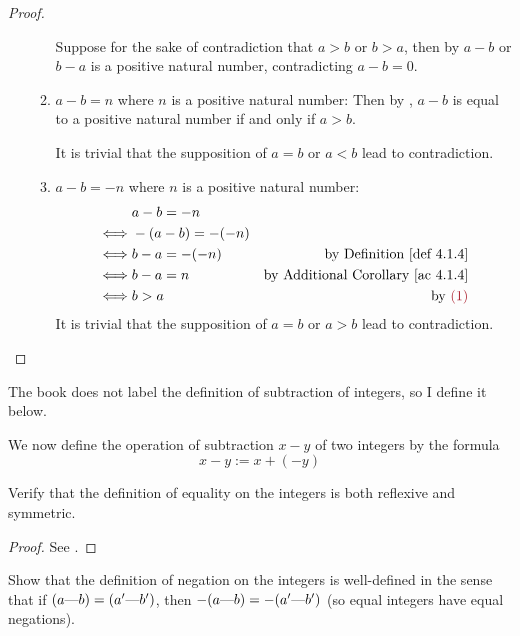 \begin{proof}
\begin{enumerate}
\begin{enumerate}
            Suppose for the sake of contradiction that \(a > b\) or \(b > a\), then by  \(a - b\) or \(b - a\) is a positive natural number, contradicting \(a - b = 0\).
        \item \(a - b = n\) where \(n\) is a positive natural number:
            Then by , \(a - b\) is equal to a positive natural number if and only if \(a > b\).
            
            It is trivial that the supposition of \(a = b\) or \(a < b\) lead to contradiction.
        \item \(a - b = -n\) where \(n\) is a positive natural number:
            \begin{align*}
                     & a - b = -n \\
                \iff & -(a - b) = -(-n) \\
                \iff & b - a = -(-n) & \text{by \DEF{4.1.4}} \\
                \iff & b - a = n & \text{by \AC{4.1.4}} \\
                \iff & b > a & \text{by \MAROON{(1)}}
            \end{align*}
            It is trivial that the supposition of \(a = b\) or \(a > b\) lead to contradiction.
    \end{enumerate}
\end{enumerate}
\end{proof}

\begin{note}
The book does not label the definition of subtraction of integers, so I define it below.
\end{note}
\begin{definition} [on page 79] \label{def 4.1.12}
We now define the operation of subtraction \(x - y\) of two integers by the formula
\[
    x - y := x + (-y)
\]
\end{definition}


\exercisesection

\begin{exercise} \label{exercise 4.1.1}
Verify that the definition of equality on the integers is both reflexive and symmetric.
\end{exercise}

\begin{proof}
See .
\end{proof}

\begin{exercise} \label{exercise 4.1.2}
Show that the definition of negation on the integers is well-defined in the sense that if \((a \text{---} b) = (a' \text{---} b')\), then \(-(a \text{---} b) = -(a' \text{---} b')\)
(so equal integers have equal negations).
\end{exercise}

